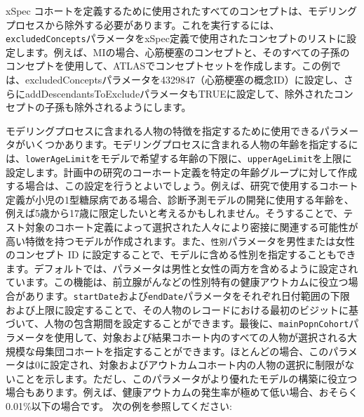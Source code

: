 \documentclass[
  11pt]{book}
\theoremstyle{definition}
\theoremstyle{definition}
\theoremstyle{definition}
\theoremstyle{definition}
\theoremstyle{remark}
\begin{document}
xSpec コホートを定義するために使用されたすべてのコンセプトは、モデリングプロセスから除外する必要があります。これを実行するには、\texttt{excludedConcepts}パラメータをxSpec定義で使用されたコンセプトのリストに設定します。例えば、MIの場合、心筋梗塞のコンセプトと、そのすべての子孫のコンセプトを使用して、ATLASでコンセプトセットを作成します。この例では、excludedConceptsパラメータを4329847（心筋梗塞の概念ID）に設定し、さらにaddDescendantsToExcludeパラメータもTRUEに設定して、除外されたコンセプトの子孫も除外されるようにします。

モデリングプロセスに含まれる人物の特徴を指定するために使用できるパラメータがいくつかあります。モデリングプロセスに含まれる人物の年齢を指定するには、\texttt{lowerAgeLimit}をモデルで希望する年齢の下限に、\texttt{upperAgeLimit}を上限に設定します。計画中の研究のコーホート定義を特定の年齢グループに対して作成する場合は、この設定を行うとよいでしょう。例えば、研究で使用するコホート定義が小児の1型糖尿病である場合、診断予測モデルの開発に使用する年齢を、例えば5歳から17歳に限定したいと考えるかもしれません。そうすることで、テスト対象のコホート定義によって選択された人々により密接に関連する可能性が高い特徴を持つモデルが作成されます。また、\texttt{性別}パラメータを男性または女性のコンセプト ID に設定することで、モデルに含める性別を指定することもできます。デフォルトでは、パラメータは男性と女性の両方を含めるように設定されています。この機能は、前立腺がんなどの性別特有の健康アウトカムに役立つ場合があります。\texttt{startDate}および\texttt{endDate}パラメータをそれぞれ日付範囲の下限および上限に設定することで、その人物のレコードにおける最初のビジットに基づいて、人物の包含期間を設定することができます。最後に、\texttt{mainPopnCohort}パラメータを使用して、対象および結果コホート内のすべての人物が選択される大規模な母集団コホートを指定することができます。ほとんどの場合、このパラメータは0に設定され、対象およびアウトカムコホート内の人物の選択に制限がないことを示します。ただし、このパラメータがより優れたモデルの構築に役立つ場合もあります。例えば、健康アウトカムの発生率が極めて低い場合、おそらく0.01\%以下の場合です。 次の例を参照してください:
\end{document}
